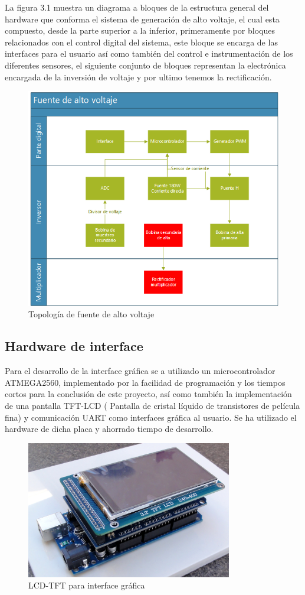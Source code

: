 La figura 3.1 muestra un diagrama a bloques de la estructura general del hardware que conforma el sistema de generación de alto voltaje, el cual esta compuesto, desde la parte superior a la inferior, primeramente por bloques relacionados con el control digital del sistema, este bloque se encarga de las interfaces para el usuario así como también del control e instrumentación de los diferentes sensores, el siguiente conjunto de bloques representan la electrónica encargada de la inversión de voltaje y por ultimo tenemos la rectificación.  \\

\begin{figure}[H]
\centering
\includegraphics[width=12cm]{Capitulo3/figs/diagrama.png}
\caption{Topología de fuente de alto voltaje}
\end{figure}
\newpage
\subsection{Hardware de interface}
Para el desarrollo de la interface gráfica se a utilizado un microcontrolador ATMEGA2560, implementado por la facilidad de programación y los tiempos cortos para la conclusión de este proyecto, así como también la implementación de una pantalla TFT-LCD ( Pantalla de cristal líquido de transistores de película fina) y comunicación UART como interfaces gráfica al usuario. Se ha utilizado el hardware de dicha placa y ahorrado tiempo de desarrollo. \\


\begin{figure}[H]
\centering
\includegraphics[width=9cm]{Capitulo3/figs/pantalla0.jpg}
\caption{LCD-TFT para interface gráfica}
\end{figure}
\newpage
